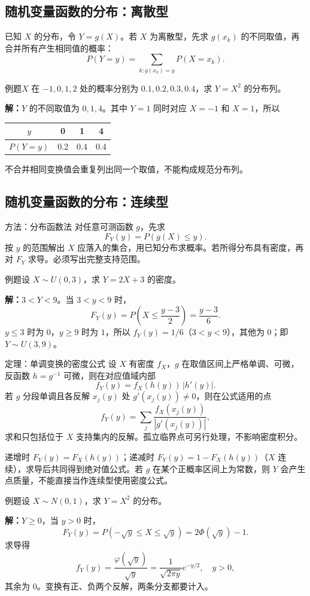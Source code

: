 \documentclass[UTF8,fontset=none,zihao=-4,a4paper]{ctexart}
\newcommand{\example}[1]{\begin{infobox}{例题}#1\end{infobox}}
\newcommand{\solution}{\par\noindent\textbf{解：}}
\begin{document}
\subsection{随机变量函数的分布：离散型}
已知 $X$ 的分布，令 $Y=g(X)$。若 $X$ 为离散型，先求 $g(x_k)$ 的不同取值，再合并所有产生相同值的概率：
\[
P(Y=y)=\sum_{k:g(x_k)=y}P(X=x_k).
\]
\example{$X$ 在 $-1,0,1,2$ 处的概率分别为 $0.1,0.2,0.3,0.4$，求 $Y=X^2$ 的分布列。}
\solution $Y$ 的不同取值为 $0,1,4$。其中 $Y=1$ 同时对应 $X=-1$ 和 $X=1$，所以
\begin{center}\begin{tabular}{cccc}\toprule
$y$&0&1&4\\\midrule
$P(Y=y)$&0.2&0.4&0.4\\\bottomrule
\end{tabular}\end{center}
不合并相同变换值会重复列出同一个取值，不能构成规范分布列。
\subsection{随机变量函数的分布：连续型}
\begin{infobox}{方法：分布函数法}
对任意可测函数 $g$，先求
\[
F_Y(y)=P(g(X)\le y).
\]
按 $y$ 的范围解出 $X$ 应落入的集合，用已知分布求概率。若所得分布具有密度，再对 $F_Y$ 求导。必须写出完整支持范围。
\end{infobox}
\example{设 $X\sim U(0,3)$，求 $Y=2X+3$ 的密度。}
\solution $3<Y<9$。当 $3<y<9$ 时，
\[
F_Y(y)=P\left(X\le\frac{y-3}{2}\right)=\frac{y-3}{6}.
\]
$y\le3$ 时为 $0$，$y\ge9$ 时为 $1$，所以 $f_Y(y)=1/6$（$3<y<9$），其他为 $0$；即 $Y\sim U(3,9)$。
\begin{infobox}{定理：单调变换的密度公式}
设 $X$ 有密度 $f_X$，$g$ 在取值区间上严格单调、可微，反函数 $h=g^{-1}$ 可微，则在对应值域内部
\[
f_Y(y)=f_X(h(y))\,|h'(y)|.
\]
若 $g$ 分段单调且各反解 $x_j(y)$ 处 $g'(x_j(y))\ne0$，则在公式适用的点
\[
f_Y(y)=\sum_j\frac{f_X(x_j(y))}{|g'(x_j(y))|},
\]
求和只包括位于 $X$ 支持集内的反解。孤立临界点可另行处理，不影响密度积分。
\end{infobox}
递增时 $F_Y(y)=F_X(h(y))$；递减时 $F_Y(y)=1-F_X(h(y))$（$X$ 连续），求导后共同得到绝对值公式。若 $g$ 在某个正概率区间上为常数，则 $Y$ 会产生点质量，不能直接当作连续型使用密度公式。
\example{设 $X\sim N(0,1)$，求 $Y=X^2$ 的分布。}
\solution $Y\ge0$，当 $y>0$ 时，
\[
F_Y(y)=P(-\sqrt y\le X\le\sqrt y)=2\Phi(\sqrt y)-1.
\]
求导得
\[
f_Y(y)=\frac{\varphi(\sqrt y)}{\sqrt y}
=\frac1{\sqrt{2\pi y}}e^{-y/2},\quad y>0,
\]
其余为 $0$。变换有正、负两个反解，两条分支都要计入。
\end{document}
